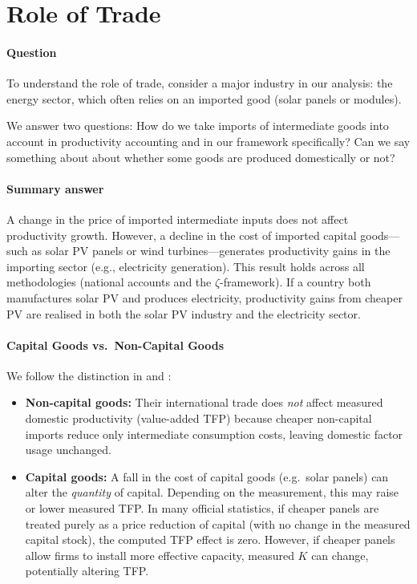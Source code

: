 \documentclass[11pt]{article}
\begin{document}
\section{Role of Trade}

\paragraph{Question} To understand the role of trade, consider a major industry in our analysis: the energy sector, which often relies on an imported good (solar panels or modules).

We answer two questions: How do we take imports of intermediate goods into account in productivity accounting and in our framework specifically? Can we say something about about whether some goods are produced domestically or not?

\paragraph{Summary answer} A change in the price of imported intermediate inputs does not affect productivity growth. However, a decline in the cost of imported capital goods—such as solar PV panels or wind turbines—generates productivity gains in the importing sector (e.g., electricity generation). This result holds across all methodologies (national accounts and the $\zeta$-framework). If a country both manufactures solar PV and produces electricity, productivity gains from cheaper PV are realised in both the solar PV industry and the electricity sector.




\paragraph{Capital Goods vs.\ Non-Capital Goods}
We follow the distinction in \cite{eatonTradeCapitalGoods2001} and \cite{xuCapitalGoodsTrade1999}:
\begin{itemize}
\item \textbf{Non-capital goods:} Their international trade does \emph{not} affect measured domestic productivity (value-added TFP) because cheaper non-capital imports reduce only intermediate consumption costs, leaving domestic factor usage unchanged.
\item \textbf{Capital goods:} A fall in the cost of capital goods (e.g.\ solar panels) can alter the \emph{quantity} of capital. Depending on the measurement, this may raise or lower measured TFP. In many official statistics, if cheaper panels are treated purely as a price reduction of capital (with no change in the measured capital stock), the computed TFP effect is zero. However, if cheaper panels allow firms to install more effective capacity, measured $K$ can change, potentially altering TFP.
\end{itemize}
\end{document}
